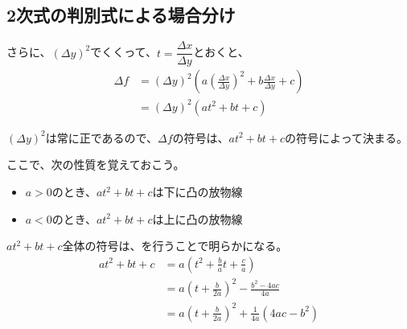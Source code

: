 \documentclass[../../../topic_calculus]{subfiles}
\begin{document}
\subsection{2次式の判別式による場合分け}

さらに、$(\Delta y)^2$でくくって、$t = \dfrac{\Delta x}{\Delta y}$とおくと、
\begin{align*}
  \Delta f &= (\Delta y)^2\left(a \left(\frac{\Delta x}{\Delta y}\right)^2 + b\frac{\Delta x}{\Delta y} + c\right) \\
  &= (\Delta y)^2(at^2 + bt + c)
\end{align*}

$(\Delta y)^2$は常に正であるので、$\Delta f$の符号は、$at^2 + bt + c$の符号によって決まる。

\br

ここで、次の性質を覚えておこう。
\begin{itemize}
  \item $a > 0$のとき、$at^2 + bt + c$は下に凸の放物線
  \item $a < 0$のとき、$at^2 + bt + c$は上に凸の放物線
\end{itemize}

$at^2 + bt + c$全体の符号は、を行うことで明らかになる。
\begin{align*}
  at^2 + bt + c & = a \left(t^2 + \frac{b}{a}t + \frac{c}{a}\right) \\
  &= a\left(t + \frac{b}{2a}\right)^2 - \frac{b^2 - 4ac}{4a} \\
  &= a\left(t + \frac{b}{2a}\right)^2 + \frac{1}{4a}\left(4ac - b^2\right)
\end{align*}
\end{document}
